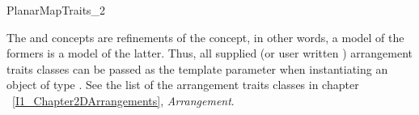 \begin{ccRefConcept}{PlanarMapTraits_2}

\ccHasModels

The  and
 concepts are refinements of the
 concept, in other words, a model of the
formers is a model of the latter.  Thus, all
supplied (or user written ) arrangement traits classes can be passed
as the  template parameter when instantiating an object of
type .  See the list of the arrangement
traits classes in chapter ~\ref{I1_Chapter2DArrangements},
{\em Arrangement}.
  
\end{ccRefConcept} %

\ccRefPageEnd
